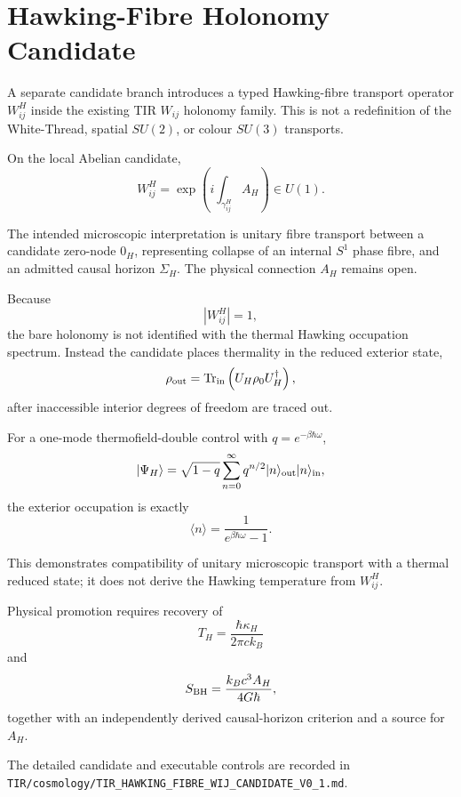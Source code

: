 \section{Hawking-Fibre Holonomy Candidate}
\label{sec:hawking_fibre_wij_candidate}

A separate candidate branch introduces a typed Hawking-fibre transport
operator \(W^H_{ij}\) inside the existing TIR \(W_{ij}\) holonomy family.
This is not a redefinition of the White-Thread, spatial \(SU(2)\), or colour
\(SU(3)\) transports.

On the local Abelian candidate,
\[
W^H_{ij}
=
\exp\!\left(
i\int_{\gamma^H_{ij}} A_H
\right)
\in U(1).
\]

The intended microscopic interpretation is unitary fibre transport between a
candidate zero-node \(0_H\), representing collapse of an internal \(S^1\)
phase fibre, and an admitted causal horizon \(\Sigma_H\).  The physical
connection \(A_H\) remains open.

Because
\[
|W^H_{ij}|=1,
\]
the bare holonomy is not identified with the thermal Hawking occupation
spectrum.  Instead the candidate places thermality in the reduced exterior
state,
\[
\rho_{\rm out}
=
{\rm Tr}_{\rm in}
\left(
U_H\rho_0U_H^\dagger
\right),
\]
after inaccessible interior degrees of freedom are traced out.

For a one-mode thermofield-double control with
\(q=e^{-\beta\hbar\omega}\),
\[
|\Psi_H\rangle
=
\sqrt{1-q}
\sum_{n=0}^{\infty}
q^{n/2}|n\rangle_{\rm out}|n\rangle_{\rm in},
\]
the exterior occupation is exactly
\[
\langle n\rangle
=
\frac{1}{e^{\beta\hbar\omega}-1}.
\]

This demonstrates compatibility of unitary microscopic transport with a
thermal reduced state; it does not derive the Hawking temperature from
\(W^H_{ij}\).

Physical promotion requires recovery of
\[
T_H=\frac{\hbar\kappa_H}{2\pi c k_B}
\]
and
\[
S_{\rm BH}
=
\frac{k_Bc^3 A_H}{4G\hbar},
\]
together with an independently derived causal-horizon criterion and a source
for \(A_H\).

The detailed candidate and executable controls are recorded in
\texttt{TIR/cosmology/TIR\_HAWKING\_FIBRE\_WIJ\_CANDIDATE\_V0\_1.md}.
